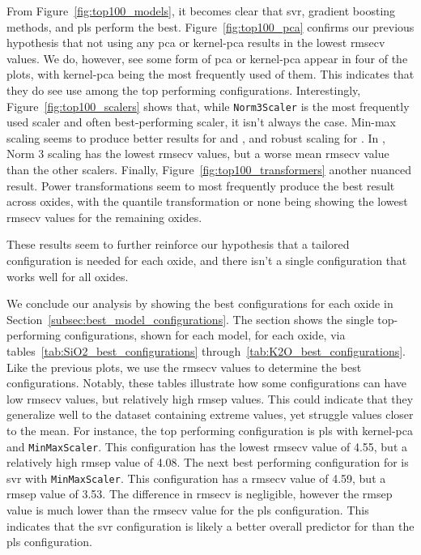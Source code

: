 From Figure~\ref{fig:top100_models}, it becomes clear that \gls{svr}, gradient boosting methods, and \gls{pls} perform the best.
Figure~\ref{fig:top100_pca} confirms our previous hypothesis that not using any \gls{pca} or \gls{kernel-pca} results in the lowest \gls{rmsecv} values.
We do, however, see some form of \gls{pca} or \gls{kernel-pca} appear in four of the plots, with \gls{kernel-pca} being the most frequently used of them.
This indicates that they do see use among the top performing configurations.
Interestingly, Figure~\ref{fig:top100_scalers} shows that, while \texttt{Norm3Scaler} is the most frequently used scaler and often best-performing scaler, it isn't always the case.
Min-max scaling seems to produce better results for  and , and robust scaling for .
In , Norm 3 scaling has the lowest \gls{rmsecv} values, but a worse mean \gls{rmsecv} value than the other scalers.
Finally, Figure~\ref{fig:top100_transformers} another nuanced result.
Power transformations seem to most frequently produce the best result across oxides, with the quantile transformation or none being showing the lowest \gls{rmsecv} values for the remaining oxides.

These results seem to further reinforce our hypothesis that a tailored configuration is needed for each oxide, and there isn't a single configuration that works well for all oxides.



We conclude our analysis by showing the best configurations for each oxide in Section~\ref{subsec:best_model_configurations}.
The section shows the single top-performing configurations, shown for each model, for each oxide, via tables~\ref{tab:SiO2_best_configurations} through~\ref{tab:K2O_best_configurations}.
Like the previous plots, we use the \gls{rmsecv} values to determine the best configurations.
Notably, these tables illustrate how some configurations can have low \gls{rmsecv} values, but relatively high \gls{rmsep} values.
This could indicate that they generalize well to the dataset containing extreme values, yet struggle values closer to the mean.
For instance, the top performing  configuration is \gls{pls} with \gls{kernel-pca} and \texttt{MinMaxScaler}.
This configuration has the lowest \gls{rmsecv} value of 4.55, but a relatively high \gls{rmsep} value of 4.08.
The next best performing configuration for  is \gls{svr} with \texttt{MinMaxScaler}.
This configuration has a \gls{rmsecv} value of 4.59, but a \gls{rmsep} value of 3.53.
The difference in \gls{rmsecv} is negligible, however the \gls{rmsep} value is much lower than the \gls{rmsecv} value for the \gls{pls} configuration.
This indicates that the \gls{svr} configuration is likely a better overall predictor for  than the \gls{pls} configuration.

